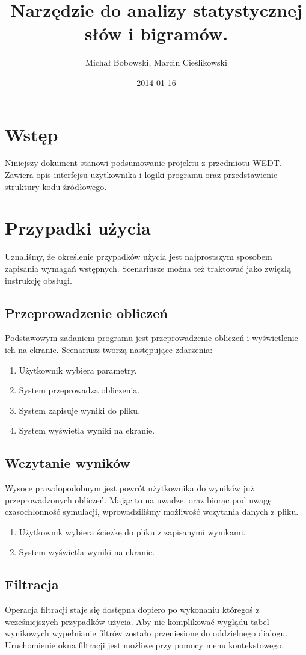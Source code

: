 \documentclass[11pt]{article}
\author{Michał Bobowski, Marcin Cieślikowski}
\date{2014-01-16}
\title{Narzędzie do analizy statystycznej słów i bigramów.}
\begin{document}
  \maketitle

\section{Wstęp}
Niniejszy dokument stanowi podsumowanie projektu z przedmiotu WEDT.
Zawiera opis interfejsu użytkownika i logiki programu oraz przedstawienie struktury kodu źródłowego.

\section{Przypadki użycia}
Uznaliśmy, że określenie przypadków użycia jest najprostszym sposobem zapisania wymagań wstępnych.
Scenariusze można też traktować jako zwięzłą instrukcję obsługi.

\subsection{Przeprowadzenie obliczeń}
Podstawowym zadaniem programu jest przeprowadzenie obliczeń i wyświetlenie ich na ekranie.
Scenariusz tworzą następujące zdarzenia:
\begin{enumerate}
 \item Użytkownik wybiera parametry.
 \item System przeprowadza obliczenia.
 \item System zapisuje wyniki do pliku.
 \item System wyświetla wyniki na ekranie.
\end{enumerate}

\subsection{Wczytanie wyników}
Wysoce prawdopodobnym jest powrót użytkownika do wyników już przeprowadzonych obliczeń.
Mając to na uwadze, oraz biorąc pod uwagę czasochłonność symulacji, wprowadziliśmy możliwość wczytania danych z pliku.
\begin{enumerate}
 \item Użytkownik wybiera ścieżkę do pliku z zapisanymi wynikami.
 \item System wyświetla wyniki na ekranie.
\end{enumerate}

\subsection{Filtracja}
Operacja filtracji staje się dostępna dopiero po wykonaniu któregoś z wcześniejszych przypadków użycia.
Aby nie komplikować wyglądu tabel wynikowych wypełnianie filtrów zostało przeniesione do oddzielnego dialogu.
Uruchomienie okna filtracji jest możliwe przy pomocy menu kontekstowego.
\end{document}
